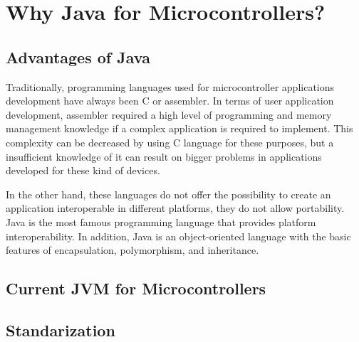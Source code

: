 \chapter{Why Java for Microcontrollers?}\label{C:Why}
\section{Advantages of Java}\label{L:Why:Adv}
Traditionally, programming languages used for microcontroller applications development have always been C or assembler. In terms of user application development, assembler required a high level of programming and memory management knowledge if a complex application is required to implement. This complexity can be decreased by using C language for these purposes, but a insufficient knowledge of it can result on bigger problems in applications developed for these kind of devices.

In the other hand, these languages do not offer the possibility to create an application interoperable in different platforms, they do not allow portability. Java is the most famous programming language that provides platform interoperability. In addition, Java is an object-oriented language with the basic features of encapsulation, polymorphism, and inheritance.
\section{Current JVM for Microcontrollers}\label{L:Why:Current}
\section{Standarization}\label{L:Why:Std}